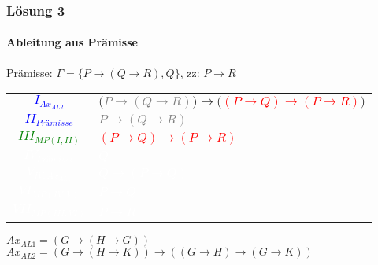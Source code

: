 \begin{frame}
	\frametitle{Lösung 3}
	\framesubtitle{Ableitung aus Prämisse}
	Prämisse: $\Gamma =\{P\rightarrow(Q\rightarrow R), Q\}$, zz: $P\rightarrow R$\\
	\begin{tabular}{cl}
		\textcolor{blue}{$I_{Ax_{AL2}}$}       & $($\textcolor{gray}{$P\rightarrow(Q\rightarrow R)$}$)\rightarrow($\textcolor{red}{$(P\rightarrow Q)\rightarrow(P\rightarrow R)$}$)$ \\
		\textcolor{blue}{$II_{Prämisse}$}      & \textcolor{gray}{$P\rightarrow(Q\rightarrow R)$}                                                                                    \\
		\textcolor{green}{$III_{MP(I, II)}$}   & \textcolor{red}{$(P\rightarrow Q)\rightarrow(P\rightarrow R)$}                                                                      \\
		\textcolor{white}{$IV_{Prämisse}$}     & \textcolor{white}{$Q$}                                                                                                              \\
		\textcolor{white}{$V_{IV, Ax_{AL1}}$}  & \textcolor{white}{$Q\rightarrow(P\rightarrow Q)$}                                                                                   \\
		\textcolor{white}{$VI_{MP(IV, V)}$}    & \textcolor{white}{$P\rightarrow Q$}                                                                                                 \\
		\textcolor{white}{$VII_{MP(III, VI)}$} & \textcolor{white}{$P\rightarrow R$}                                                                                                 \\
	\end{tabular}
	$Ax_{AL1} = (G\rightarrow(H\rightarrow G))$\\
	$Ax_{AL2} = (G\rightarrow(H\rightarrow K))\rightarrow((G\rightarrow H)\rightarrow(G\rightarrow K))$\\
\end{frame}
